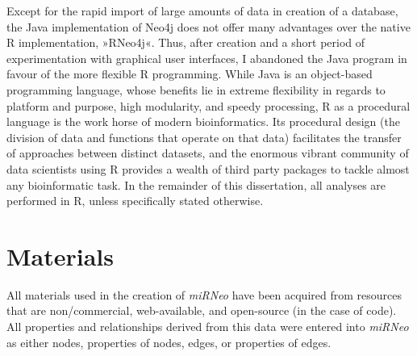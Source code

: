 Except for the rapid import of large amounts of data in creation of a database, the Java implementation of Neo4j does not offer many advantages over the native R implementation, »RNeo4j«. Thus, after creation and a short period of experimentation with graphical user interfaces, I abandoned the Java program in favour of the more flexible R programming. While Java is an object-based programming language, whose benefits lie in extreme flexibility in regards to platform and purpose, high modularity, and speedy processing, R as a procedural language is the work horse of modern bioinformatics. Its procedural design (the division of data and functions that operate on that data) facilitates the transfer of approaches between distinct datasets, and the enormous vibrant community of data scientists using R provides a wealth of third party packages to tackle almost any bioinformatic task. In the remainder of this dissertation, all analyses are performed in R, unless specifically stated otherwise.


\section{Materials}
All materials used in the creation of \textit{miRNeo} have been acquired from resources that are non\-/commercial, web-available, and open-source (in the case of code). All properties and relationships derived from this data were entered into \textit{miRNeo} as either nodes, properties of nodes, edges, or properties of edges. 

